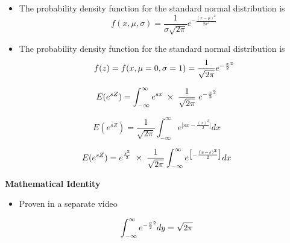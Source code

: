 \documentclass[12pt]{report}
\begin{document}
	
	
	
	\Large
	\begin{itemize}
		\item 
		The probability density function for the standard normal distribution is
		{
			\Large
			\[f(x, \mu, \sigma) = \frac{1}{\sigma\sqrt{2\pi}} e^{ -\frac{(x-\mu)^2}{2\sigma^2} }\]}
		\item 
		The probability density function for the standard normal distribution is
		{
			\Large
			\[f(z) = f(x, \mu= 0, \sigma=1) = \frac{1}{\sqrt{2\pi}} e^{ -{x \over 2}^2 }\]
		}
	\end{itemize}
	
	
	\Large
	
	
	
	{
		\LARGE
		\[ E( e^{sZ} ) =  \int_{-\infty}^{\infty}  e^{sx} \;\times\; \frac{1}{\sqrt{2\pi}} \;e^{ -{x \over 2}^2 }\]
	}
	
	
	
	
	\Large
	
	
	
	{
		\LARGE
		\[ E( e^{sZ} ) =  \frac{1}{\sqrt{2\pi}} \int_{-\infty}^{\infty}   e^{ \big[sx-\frac{(x)^2}{2} \big]} dx   \]
	}
	
	
	
	\Large
	
	
	
	{
		\LARGE
		\[ E( e^{sZ} ) =  e^{{s^2\over 2}} \; \times\; \frac{1}{\sqrt{2\pi}} \int_{-\infty}^{\infty} e^{ \big[-\frac{(x-s)^2}{2} \big]} dx   \]
	}
	
	
	
	\Large
	\textbf{Mathematical Identity}
	\begin{itemize}
		\item Proven in a separate video
	\end{itemize}
	{
		\LARGE
		\[\int_{-\infty}^{\infty} e^{-{y\over 2}^2}dy  = \sqrt{2\pi}\]
		
	}
	
\end{document}
